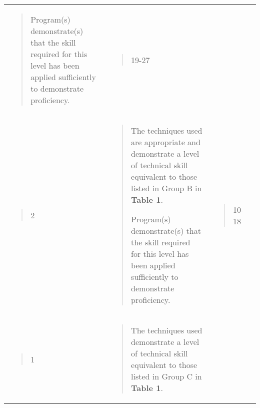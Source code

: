 \documentclass[
]{article}
\begin{document}
\begin{longtable}[]{@{}llll@{}}
\begin{minipage}[t]{0.22\columnwidth}
\begin{quote}
Program(s) demonstrate(s) that the skill required for this level has
been applied sufficiently to demonstrate proficiency.
\end{quote}\strut
\end{minipage} & \begin{minipage}[t]{0.22\columnwidth}\raggedright
\begin{quote}
19-27
\end{quote}\strut
\end{minipage} & \begin{minipage}[t]{0.22\columnwidth}\raggedright
\strut
\end{minipage}\tabularnewline
\begin{minipage}[t]{0.22\columnwidth}\raggedright
\begin{quote}
2
\end{quote}\strut
\end{minipage} & \begin{minipage}[t]{0.22\columnwidth}\raggedright
\begin{quote}
The techniques used are appropriate and demonstrate a level of technical
skill equivalent to those listed in Group B in \textbf{Table 1}.

Program(s) demonstrate(s) that the skill required for this level has
been applied sufficiently to demonstrate proficiency.
\end{quote}\strut
\end{minipage} & \begin{minipage}[t]{0.22\columnwidth}\raggedright
\begin{quote}
10-18
\end{quote}\strut
\end{minipage} & \begin{minipage}[t]{0.22\columnwidth}\raggedright
\strut
\end{minipage}\tabularnewline
\begin{minipage}[t]{0.22\columnwidth}\raggedright
\begin{quote}
1
\end{quote}\strut
\end{minipage} & \begin{minipage}[t]{0.22\columnwidth}\raggedright
\begin{quote}
The techniques used demonstrate a level of technical skill equivalent to
those listed in Group C in \textbf{Table 1}.


\end{quote}
\end{minipage}
\end{longtable}
\end{document}
